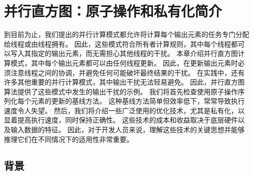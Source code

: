 \section{并行直方图：原子操作和私有化简介}
到目前为止，我们提出的并行计算模式都允许将计算每个输出元素的任务专门分配给线程或由线程拥有。 因此，这些模式符合所有者计算规则，其中每个线程都可以写入其指定的输出元素，而无需担心其他线程的干扰。 本章介绍并行直方图计算模式，其中每个输出元素都可以由任何线程更新。 因此，在更新输出元素时必须注意线程之间的协调，并避免任何可能破坏最终结果的干扰。 在实践中，还有许多其他重要的并行计算模式，其中输出干扰无法轻易避免。 因此，并行直方图算法提供了这些模式中发生的输出干扰的示例。 我们将首先检查使用原子操作序列化每个元素的更新的基线方法。 这种基线方法简单但效率低下，常常导致执行速度令人失望。 然后，我们将介绍一些广泛使用的优化技术，尤其是私有化，以显着提高执行速度，同时保持正确性。 这些技术的成本和收益取决于底层硬件以及输入数据的特征。 因此，对于开发人员来说，理解这些技术的关键思想并能够推理它们在不同情况下的适用性非常重要。

\subsection{背景}